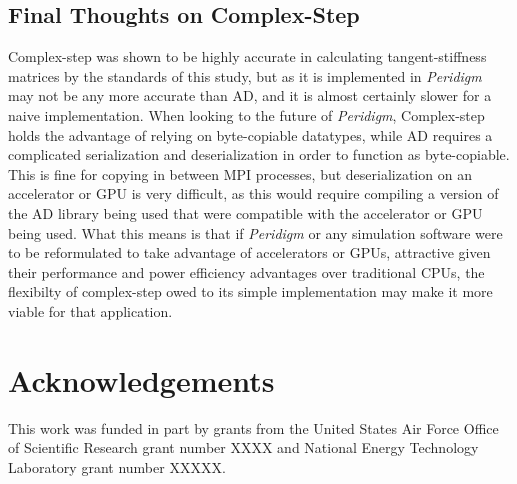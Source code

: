 \documentclass[preprint,12pt]{elsarticle}
\begin{document}
\subsection{Final Thoughts on Complex-Step} Complex-step was shown to be highly accurate in
calculating tangent-stiffness matrices by the standards of this study, but as it is implemented in
\emph{Peridigm} may not be any more accurate than AD, and it is almost certainly slower for a naive
implementation. When looking to the future of \emph{Peridigm}, Complex-step holds the advantage of
relying on byte-copiable datatypes, while AD requires a complicated serialization and
deserialization in order to function as byte-copiable. This is fine for copying in between MPI
processes, but deserialization on an accelerator or GPU is very difficult, as this would require
compiling a version of the AD library being used that were compatible with the accelerator or GPU
being used. What this means is that if \emph{Peridigm} or any simulation software were to be
reformulated to take advantage of accelerators or GPUs, attractive given their performance and power
efficiency advantages over traditional CPUs, the flexibilty of complex-step owed to its simple
implementation may make it more viable for that application.




\section{Acknowledgements}
This work was funded in part by grants from the United States Air Force Office of Scientific
Research grant number XXXX and National Energy Technology Laboratory grant number XXXXX. 
\label{sec:ack}





\appendix
\renewcommand*{\thesection}{\Alph{section}}
%
\end{document}

